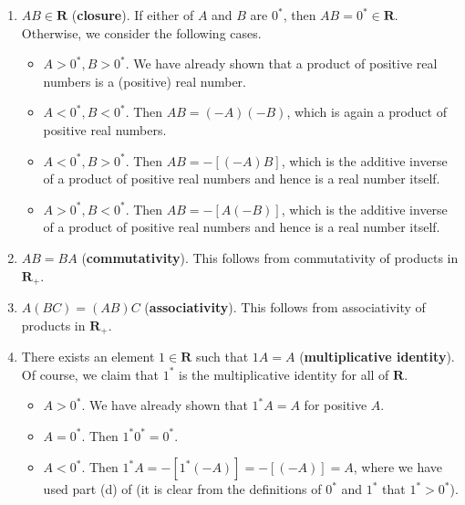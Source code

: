 \documentclass[12pt]{article}
\newcommand{\R}{\mathbf{R}}
\theoremstyle{definition}
\begin{document}
\begin{enumerate}[label = (M\arabic*)]
    \item \( AB \in \R \) (\textbf{closure}). If either of \( A \) and \( B \) are \( 0^* \), then \( AB = 0^* \in \R \). Otherwise, we consider the following cases.
    
    \begin{itemize}
        \item \( A > 0^*, B > 0^* \). We have already shown that a product of positive real numbers is a (positive) real number.
        
        \item \( A < 0^*, B < 0^* \). Then \( AB = (-A)(-B) \), which is again a product of positive real numbers.
        
        \item \( A < 0^*, B > 0^* \). Then \( AB = -[(-A)B] \), which is the additive inverse of a product of positive real numbers and hence is a real number itself.
        
        \item \( A > 0^*, B < 0^* \). Then \( AB = -[A(-B)] \), which is the additive inverse of a product of positive real numbers and hence is a real number itself.
    \end{itemize}

    \item \( AB = BA \) (\textbf{commutativity}). This follows from commutativity of products in \( \R_+ \).

    \item \( A(BC) = (AB)C \) (\textbf{associativity}). This follows from associativity of products in \( \R_+ \).

    \item There exists an element \( 1 \in \R \) such that \( 1A = A \) (\textbf{multiplicative identity}). Of course, we claim that \( 1^* \) is the multiplicative identity for all of \( \R \).

    \begin{itemize}
        \item \( A > 0^* \). We have already shown that \( 1^* A = A \) for positive \( A \).

        \item \( A = 0^* \). Then \( 1^* 0^* = 0^* \).

        \item \( A < 0^* \). Then \( 1^* A = -[1^* (-A)] = -[(-A)] = A \), where we have used part (d) of  (it is clear from the definitions of \( 0^* \) and \( 1^* \) that \( 1^* > 0^* \)).
    \end{itemize}


\end{enumerate}
\end{document}
